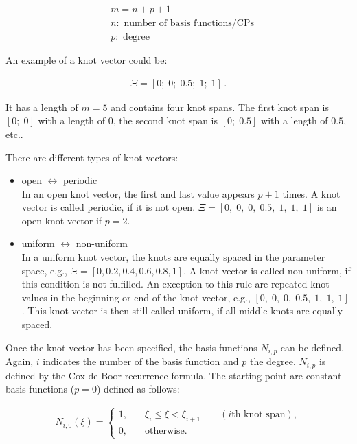 \documentclass[11pt,a4paper]{article}
\begin{document}
\begin{align}
&m=n+p+1 \\
		&n:\text{ number of basis functions/CPs} \nonumber \\
		&p:\text{ degree} \nonumber
\end{align}

An example of a knot vector could be:

\begin{align}
\Xi=[0;\; 0;\; 0.5;\; 1;\; 1] \,.
\end{align}

It has a length of $m=5$ and contains four knot spans. The first knot span is $[0;\; 0]$ with a length of $0$, the second knot span is $ [0;\; 0.5] $ with a length of $0.5$, etc..

There are different types of knot vectors:

	\begin{itemize}
	\item open  $\leftrightarrow$ periodic \\
		In an open knot vector, the first and last value appears $p+1$ times. A knot vector is called periodic, if it is not open. $\Xi=[0,\; 0,\; 0,\; 0.5,\; 1,\; 1,\; 1]$ is an open knot vector if $p=2$.
    \item uniform  $\leftrightarrow$ non-uniform \\
		In a uniform knot vector, the knots are equally spaced in the parameter space, e.g., $ \Xi=[0, 0.2, 0.4, 0.6, 0.8, 1]$. A knot vector is called non-uniform, if this condition is not fulfilled. An exception to this rule are repeated knot values in the beginning or end of the knot vector, e.g., $[0,\; 0,\; 0,\; 0.5,\; 1,\; 1,\; 1]$. This knot vector is then still called uniform, if all middle knots are equally spaced.
	\end{itemize}

\vspace{0.5cm}
Once the knot vector has been specified, the basis functions $N_{i,p}$ can be defined. Again, $i$ indicates the number of the basis function and $p$ the degree.  $N_{i,p}$ is defined by the Cox de Boor recurrence formula. The starting point are constant basis functions ($p=0$) defined as follows:

\begin{align}
N_{i,0}(\xi)=
	\begin{cases}
		1,	& \quad \xi_{i}\le\xi<\xi_{i+1} \qquad (i\text{th knot span}), \\
		0,	& \quad \text{otherwise.}
	\end{cases}
\end{align}
\end{document}
